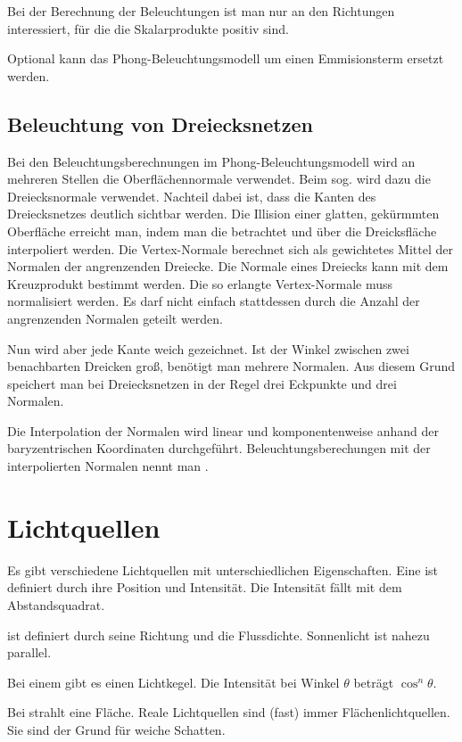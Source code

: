 Bei der Berechnung der Beleuchtungen ist man nur an den Richtungen interessiert, für die die Skalarprodukte positiv sind.

Optional kann das Phong-Beleuchtungsmodell um einen Emmisionsterm ersetzt werden.

\subsection{Beleuchtung von Dreiecksnetzen}
Bei den Beleuchtungsberechnungen im Phong-Beleuchtungsmodell wird an mehreren Stellen die Oberflächennormale verwendet.
Beim sog.  wird dazu die Dreiecksnormale verwendet.
Nachteil dabei ist, dass die Kanten des Dreiecksnetzes deutlich sichtbar werden.
Die Illision einer glatten, gekürmmten Oberfläche erreicht man, indem man die  betrachtet und über die Dreicksfläche interpoliert werden.
Die Vertex-Normale berechnet sich als gewichtetes Mittel der Normalen der angrenzenden Dreiecke.
Die Normale eines Dreiecks kann mit dem Kreuzprodukt bestimmt werden.
Die so erlangte Vertex-Normale muss normalisiert werden.
Es darf nicht einfach stattdessen durch die Anzahl der angrenzenden Normalen geteilt werden.

Nun wird aber jede Kante weich gezeichnet.
Ist der Winkel zwischen zwei benachbarten Dreicken groß, benötigt man mehrere Normalen.
Aus diesem Grund speichert man bei Dreiecksnetzen in der Regel drei Eckpunkte und drei Normalen.

Die Interpolation der Normalen wird linear und komponentenweise anhand der baryzentrischen Koordinaten durchgeführt.
Beleuchtungsberechungen mit der interpolierten Normalen nennt man .

\section{Lichtquellen}
Es gibt verschiedene Lichtquellen mit unterschiedlichen Eigenschaften.
Eine  ist definiert durch ihre Position und Intensität.
Die Intensität fällt mit dem Abstandsquadrat.

 ist definiert durch seine Richtung und die Flussdichte.
Sonnenlicht ist nahezu parallel.

Bei einem  gibt es einen Lichtkegel.
Die Intensität bei Winkel $\theta$ beträgt $\cos^n \theta$.

Bei  strahlt eine Fläche.
Reale Lichtquellen sind (fast) immer Flächenlichtquellen.
Sie sind der Grund für weiche Schatten.

